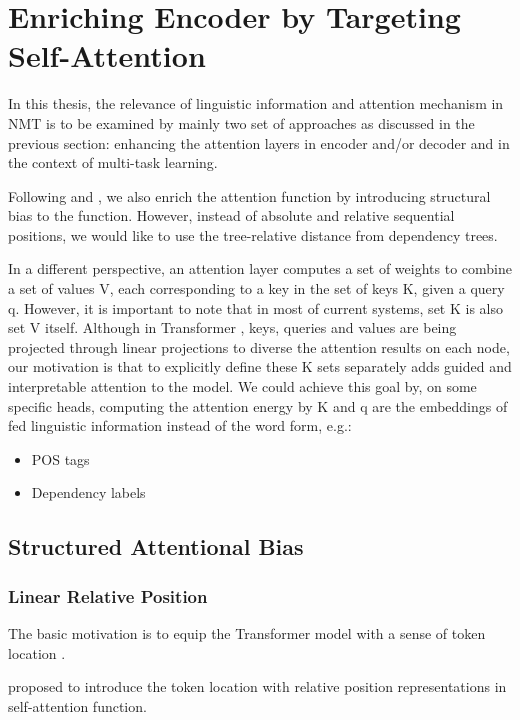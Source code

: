 \chapter{Enriching Encoder by Targeting Self-Attention}
In this thesis, the relevance of linguistic information and attention mechanism in NMT is to be examined by mainly two set of approaches as discussed in the previous section: enhancing the attention layers in encoder and/or decoder and in the context of multi-task learning.

Following \cite{DBLP:conf/naacl/CohnHVYDH16} and \cite{DBLP:conf/naacl/ShawUV18}, we also enrich the attention function by introducing structural bias to the function. However, instead of absolute and relative sequential positions, we would like to use the tree-relative distance from dependency trees.

In a different perspective, an attention layer computes a set of weights to combine a set of values V, each corresponding to a key in the set of keys K, given a query q. However, it is important to note that in most of current systems, set K is also set V itself. Although in Transformer \citep{DBLP:conf/nips/VaswaniSPUJGKP17}, keys, queries and values are being projected through linear projections to diverse the attention results on each node, our motivation is that to explicitly define these K sets separately adds guided and interpretable attention to the model. We could achieve this goal by, on some specific heads, computing the attention energy by K and q are the embeddings of fed linguistic information instead of the word form, e.g.:
\begin{itemize}
    \item POS tags
    \item Dependency labels
\end{itemize}


\section{Structured Attentional Bias}

\subsection{Linear Relative Position}
The basic motivation is to equip the Transformer model with a sense of token location \citep{DBLP:conf/nips/VaswaniSPUJGKP17}.

 \cite{DBLP:conf/naacl/ShawUV18} proposed to introduce the token location with relative position representations in self-attention function.
 
